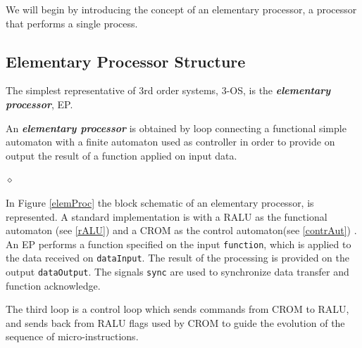 We will begin by introducing the concept of an elementary processor, a processor that performs a single process.

\subsection{Elementary Processor Structure}

The simplest representative of 3rd order systems, 3-OS, is the {\bf {\em elementary processor}}, EP.

\begin{definition}
An {\bf {\em elementary processor}} is obtained by loop connecting a functional simple automaton with a finite automaton used as controller in order to provide on output the result of a function applied on input data.

$\diamond$
\end{definition}


In Figure \ref{elemProc} the block schematic of an elementary processor, is represented. A standard implementation is with a RALU as the functional automaton (see \ref{rALU})  and a CROM as the control automaton(see \ref{contrAut}) . An EP performs a function specified on the input {\tt function}, which is applied to the data received on {\tt dataInput}. The result of the processing is provided on the output {\tt dataOutput}. The signals {\tt sync} are used to synchronize data transfer and function acknowledge.


The third loop is a control loop which sends commands from CROM to RALU, and sends back from RALU flags used by CROM to guide the evolution of the sequence of micro-instructions.


